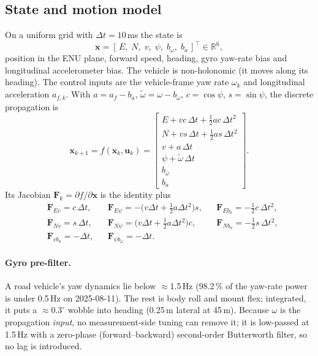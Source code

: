 \documentclass[10pt,a4paper]{article}
\newcommand{\x}{\bm{x}}
\newcommand{\Fm}{\mathbf{F}}
\newcommand{\R}{\mathbb{R}}
\begin{document}
\subsection{State and motion model}
On a uniform grid with $\Delta t = 10$\,ms the state is
\begin{equation}
\x = [\,E,\; N,\; v,\; \psi,\; b_\omega,\; b_a\,]^\top \in \R^6,
\end{equation}
position in the ENU plane, forward speed, heading, gyro yaw-rate bias and longitudinal accelerometer bias.
The vehicle is non-holonomic (it moves along its heading). The control inputs are the vehicle-frame yaw
rate $\omega_k$ and longitudinal acceleration $a_{f,k}$. With $a = a_f - b_a$, $\tilde\omega = \omega - b_\omega$,
$c=\cos\psi$, $s=\sin\psi$, the discrete propagation is
\begin{equation}
\x_{k+1} = f(\x_k, \bm u_k) =
\begin{bmatrix}
E + v c\,\Delta t + \tfrac12 a c\,\Delta t^2\\
N + v s\,\Delta t + \tfrac12 a s\,\Delta t^2\\
v + a\,\Delta t\\
\psi + \tilde\omega\,\Delta t\\
b_\omega\\ b_a
\end{bmatrix}.
\end{equation}
Its Jacobian $\Fm_k = \partial f/\partial\x$ is the identity plus
\begin{equation}
\begin{aligned}
&\Fm_{E v} = c\,\Delta t, && \Fm_{E\psi} = -\big(v\Delta t + \tfrac12 a\Delta t^2\big)s, && \Fm_{E b_a} = -\tfrac12 c\,\Delta t^2,\\
&\Fm_{N v} = s\,\Delta t, && \Fm_{N\psi} = \big(v\Delta t + \tfrac12 a\Delta t^2\big)c, && \Fm_{N b_a} = -\tfrac12 s\,\Delta t^2,\\
&\Fm_{v b_a} = -\Delta t, && \Fm_{\psi b_\omega} = -\Delta t . &&
\end{aligned}
\end{equation}

\paragraph{Gyro pre-filter.} A road vehicle's yaw dynamics lie below $\approx$1.5\,Hz (98.2\,\% of the yaw-rate
power is under 0.5\,Hz on 2025-08-11). The rest is body roll and mount flex; integrated, it puts a
$\approx0.3^\circ$ wobble into heading (0.25\,m lateral at 45\,m). Because $\omega$ is the propagation
\emph{input}, no measurement-side tuning can remove it; it is low-passed at 1.5\,Hz with a zero-phase
(forward--backward) second-order Butterworth filter, so no lag is introduced.
\end{document}
